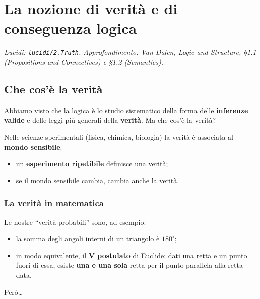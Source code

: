 \chapter{La nozione di verità e di conseguenza logica}

\textit{Lucidi: \texttt{lucidi/2.Truth}. Approfondimento: Van Dalen,
\emph{Logic and Structure}, §1.1 (Propositions and Connectives) e §1.2
(Semantics).}

\section{Che cos'è la verità}

Abbiamo visto che la logica è lo studio sistematico della forma delle
\textbf{inferenze valide} e delle leggi più generali della \textbf{verità}.
Ma che cos'è la verità?


Nelle scienze sperimentali (fisica, chimica, biologia) la verità è associata
al \textbf{mondo sensibile}:
\begin{itemize}
  \item un \textbf{esperimento ripetibile} definisce una verità;
  \item se il mondo sensibile cambia, cambia anche la verità.
\end{itemize}


\subsection{La verità in matematica}

Le nostre ``verità probabili'' sono, ad esempio:
\begin{itemize}
  \item la somma degli angoli interni di un triangolo è $180^\circ$;
  \item in modo equivalente, il \textbf{V postulato} di Euclide: dati una retta
        e un punto fuori di essa, esiste \textbf{una e una sola} retta per il
        punto parallela alla retta data.
\end{itemize}
Però\dots

